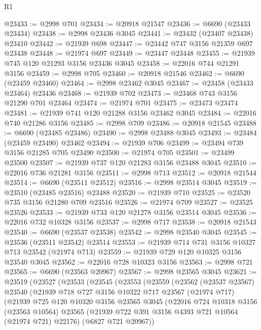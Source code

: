 \begin{lexlean}{R1}
\begin{coremodule}
@23433 := @2998 @701
@23434 := @20918 @21547
@23436 := @6690 (@23433 @23434)
@23438 := @2998 @23436 @3045
@23441 := @23432 (@23407 @23438) @23410
@23442 := @21939 @698
@23447 := @23442 @747 @3156 @21359 @697 @23438
@23448 := @21974 @697
@23449 := @23447 @23448
@23455 := @21939 @745 @120 @21293 @3156 @23436 @3045
@23458 := @22016 @744 @21291 @3156
@23459 := @2998 @705
@23460 := @20918 @21546
@23462 := @6690 (@23459 @23460)
@23464 := @2998 @23462 @3045
@23467 := @23458 (@23433 @23464) @23436
@23468 := @21939 @702
@23473 := @23468 @743 @3156 @21290 @701 @23464
@23474 := @21974 @701
@23475 := @23473 @23474
@23481 := @21939 @741 @120 @21288 @3156 @23462 @3045
@23484 := @22016 @740 @21286 @3156
@23485 := @2998 @709
@23486 := @20918 @21545
@23488 := @6690 (@23485 @23486)
@23490 := @2998 @23488 @3045
@23493 := @23484 (@23459 @23490) @23462
@23494 := @21939 @706
@23499 := @23494 @739 @3156 @21285 @705 @23490
@23500 := @21974 @705
@23501 := @23499 @23500
@23507 := @21939 @737 @120 @21283 @3156 @23488 @3045
@23510 := @22016 @736 @21281 @3156
@23511 := @2998 @713
@23512 := @20918 @21544
@23514 := @6690 (@23511 @23512)
@23516 := @2998 @23514 @3045
@23519 := @23510 (@23485 @23516) @23488
@23520 := @21939 @710
@23525 := @23520 @735 @3156 @21280 @709 @23516
@23526 := @21974 @709
@23527 := @23525 @23526
@23533 := @21939 @733 @120 @21278 @3156 @23514 @3045
@23536 := @22016 @732 @10328 @3156
@23537 := @2998 @717
@23538 := @20918 @21543
@23540 := @6690 (@23537 @23538)
@23542 := @2998 @23540 @3045
@23545 := @23536 (@23511 @23542) @23514
@23553 := @21939 @714 @731 @3156 @10327 @713 @23542 (@21974 @713)
@23559 := @21939 @729 @120 @10325 @3156 @23540 @3045
@23562 := @22016 @728 @10323 @3156
@23563 := @2998 @721
@23565 := @6690 (@23563 @20967)
@23567 := @2998 @23565 @3045
@23621 := @23519
    (@23527
      (@23533
        (@23545
          (@23553
            (@23559
              (@23562
                (@23537 @23567)
                @23540
                (@21939
                  @718
                  @727
                  @3156
                  @10322
                  @717
                  @23567
                  (@21974 @717)
                  (@21939
                    @725
                    @120
                    @10320
                    @3156
                    @23565
                    @3045
                    (@22016
                      @724
                      @10318
                      @3156
                      (@23563 @10564)
                      @23565
                      (@21939 @722 @391 @3156 @4393 @721 @10564 (@21974 @721) @22176)
                      (@6827 @721 @20967))

\end{coremodule}
\end{lexlean}
